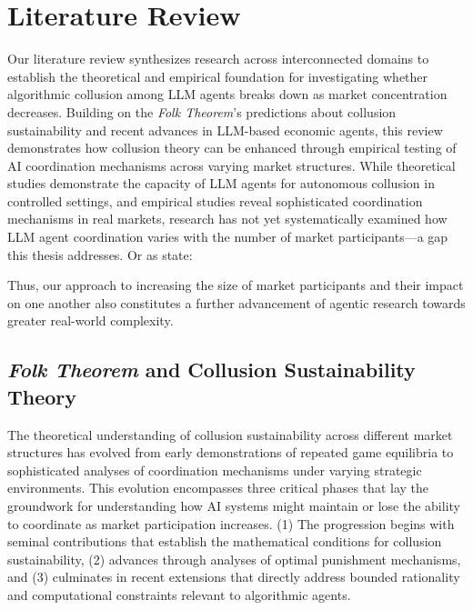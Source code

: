 \section{Literature Review}\label{sec:litrev}

Our literature review synthesizes research across interconnected domains to establish the theoretical and empirical foundation for investigating whether algorithmic collusion among LLM agents breaks down as market concentration decreases. Building on the \emph{Folk Theorem}'s predictions about collusion sustainability and recent advances in LLM-based economic agents, this review demonstrates how collusion theory can be enhanced through empirical testing of AI coordination mechanisms across varying market structures. While theoretical studies demonstrate the capacity of LLM agents for autonomous collusion in controlled settings, and empirical studies reveal sophisticated coordination mechanisms in real markets, research has not yet systematically examined how LLM agent coordination varies with the number of market participants---a gap this thesis addresses. Or as \textcite[p.24]{fish_algorithmic_2025} state:
\begin{displayquote}
\end{displayquote}

Thus, our approach to increasing the size of market participants and their impact on one another also constitutes a further advancement of agentic research towards greater real-world complexity.

\subsection{\emph{Folk Theorem} and Collusion Sustainability Theory}

The theoretical understanding of collusion sustainability across different market structures has evolved from early demonstrations of repeated game equilibria to sophisticated analyses of coordination mechanisms under varying strategic environments. This evolution encompasses three critical phases that lay the groundwork for understanding how AI systems might maintain or lose the ability to coordinate as market participation increases. (1) The progression begins with seminal contributions that establish the mathematical conditions for collusion sustainability, (2) advances through analyses of optimal punishment mechanisms, and (3) culminates in recent extensions that directly address bounded rationality and computational constraints relevant to algorithmic agents.

